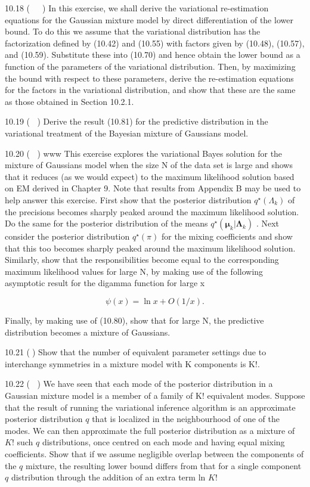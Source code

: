 \documentclass[
  10
]{article}
\begin{document}
10.18 (  ) In this exercise, we shall derive the variational
re-estimation equations for the Gaussian mixture model by direct
differentiation of the lower bound. To do this we assume that the
variational distribution has the factorization defined by (10.42) and
(10.55) with factors given by (10.48), (10.57), and (10.59). Substitute
these into (10.70) and hence obtain the lower bound as a function of the
parameters of the variational distribution. Then, by maximizing the
bound with respect to these parameters, derive the re-estimation
equations for the factors in the variational distribution, and show that
these are the same as those obtained in Section 10.2.1.

10.19 ( ) Derive the result (10.81) for the predictive distribution in
the variational treatment of the Bayesian mixture of Gaussians model.

10.20 ( ) www This exercise explores the variational Bayes solution for
the mixture of Gaussians model when the size N of the data set is large
and shows that it reduces (as we would expect) to the maximum likelihood
solution based on EM derived in Chapter 9. Note that results from
Appendix B may be used to help answer this exercise. First show that the
posterior distribution \(q ^ { \star } ( \Lambda _ { k } )\) of the
precisions becomes sharply peaked around the maximum likelihood
solution. Do the same for the posterior distribution of the means
\(q ^ { \star } ( \pmb { \mu } _ { k } | \pmb { \Lambda } _ { k } )\) .
Next consider the posterior distribution \(q ^ { \star } ( \pi )\) for
the mixing coefficients and show that this too becomes sharply peaked
around the maximum likelihood solution. Similarly, show that the
responsibilities become equal to the corresponding maximum likelihood
values for large N, by making use of the following asymptotic result for
the digamma function for large x

\[
\psi (x) = \ln x + O \left(1 / x\right).\tag{10.241}
\]

Finally, by making use of (10.80), show that for large N, the predictive
distribution becomes a mixture of Gaussians.

10.21 () Show that the number of equivalent parameter settings due to
interchange symmetries in a mixture model with K components is K!.

10.22 ( ) We have seen that each mode of the posterior distribution in a
Gaussian mixture model is a member of a family of K! equivalent modes.
Suppose that the result of running the variational inference algorithm
is an approximate posterior distribution \(q\) that is localized in the
neighbourhood of one of the modes. We can then approximate the full
posterior distribution as a mixture of \(K !\) such \(q\) distributions,
once centred on each mode and having equal mixing coefficients. Show
that if we assume negligible overlap between the components of the \(q\)
mixture, the resulting lower bound differs from that for a single
component \(q\) distribution through the addition of an extra term ln
\(K !\)
\end{document}
